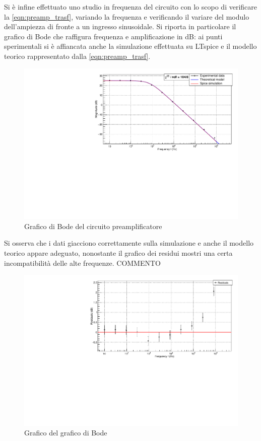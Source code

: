 \documentclass{article}
\begin{document}
Si è infine effettuato uno studio in frequenza del circuito con lo scopo di verificare la \ref{eqn:preamp_trasf}, variando la frequenza
e verificando il variare del modulo dell'ampiezza di fronte a un ingresso sinusoidale.
Si riporta in particolare il grafico di Bode che raffigura frequenza e amplificazione in dB: ai punti sperimentali si è affiancata
anche la simulazione effettuata su LTspice e il modello teorico rappresentato dalla \ref{eqn:preamp_trasf}.

\begin{center}
\begin{figure}[H]
\centering
\includegraphics[scale=0.4, angle=0]{bodepreamp.pdf}
\caption{Grafico di Bode del circuito preamplificatore}
\label{fig:bodepreamp}
\end{figure}
\end{center}

Si osserva che i dati giacciono correttamente sulla simulazione e anche il modello teorico appare adeguato, nonostante il grafico 
dei residui mostri una certa incompatibilità delle alte frequenze. COMMENTO

\begin{center}
    \begin{figure}[H]
    \centering
    \includegraphics[scale=0.4, angle=0]{bodepreampresidui.pdf}
    \caption{Grafico del grafico di Bode}
    \label{fig:bodepreamp_res}
    \end{figure}
\end{center}
\end{document}
